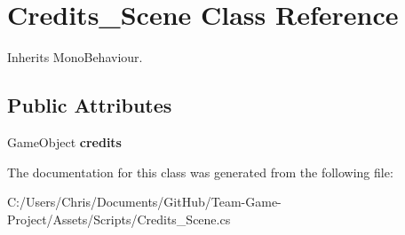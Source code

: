 \hypertarget{class_credits___scene}{}\section{Credits\+\_\+\+Scene Class Reference}
\label{class_credits___scene}


Inherits Mono\+Behaviour.

\subsection*{Public Attributes}
\begin{DoxyCompactItemize}
\item 
Game\+Object {\bfseries credits}\hypertarget{class_credits___scene_aae2ce03f67346080cd93885291239725}{}\label{class_credits___scene_aae2ce03f67346080cd93885291239725}

\end{DoxyCompactItemize}


The documentation for this class was generated from the following file\+:\begin{DoxyCompactItemize}
\item 
C\+:/\+Users/\+Chris/\+Documents/\+Git\+Hub/\+Team-\/\+Game-\/\+Project/\+Assets/\+Scripts/Credits\+\_\+\+Scene.\+cs\end{DoxyCompactItemize}
